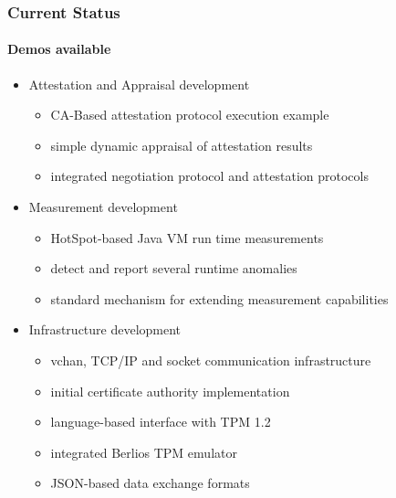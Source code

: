 \documentclass{beamer}
\begin{document}
\begin{frame}
  \frametitle{Current Status}
  \framesubtitle{Demos available}

  \begin{itemize}
  \item Attestation and Appraisal development
    \begin{itemize}
    \item CA-Based attestation protocol execution example
    \item simple dynamic appraisal of attestation results
    \item integrated negotiation protocol and attestation protocols
    \end{itemize}
  \item Measurement development
    \begin{itemize}
    \item HotSpot-based Java VM run time measurements
    \item detect and report several runtime anomalies
    \item standard mechanism for extending measurement capabilities
    \end{itemize}
  \item Infrastructure development
    \begin{itemize}
    \item vchan, TCP/IP and socket communication infrastructure
    \item initial certificate authority implementation
    \item language-based interface with TPM 1.2
    \item integrated Berlios TPM emulator
    \item JSON-based data exchange formats
    \end{itemize}
  \end{itemize}
\end{frame}
\end{document}
